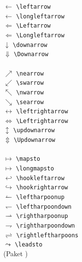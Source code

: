 \begin{minipage}{\textwidth}
\begin{multicols}{3}
\begin{tabbing}
$\leftarrow$			\>	\lstinline|\leftarrow|\\
$\longleftarrow$	\>	\lstinline|\longleftarrow| 	\\
$\Leftarrow$			\>	\lstinline|\Leftarrow| 	\\
$\Longleftarrow$	\>	\lstinline|\Longleftarrow| 	\\
$\downarrow$			\>	\lstinline|\downarrow| 	\\
$\Downarrow$			\>	\lstinline|\Downarrow| 	\\
	\tabbingrule \\
$\nearrow$				\>	\lstinline|\nearrow| 	\\
$\swarrow$				\>	\lstinline|\swarrow| 	\\
$\nwarrow$				\>	\lstinline|\nwarrow| 	\\
$\searrow$				\>	\lstinline|\searrow| 	\\
$\leftrightarrow$	\>	\lstinline|\leftrightarrow| 	\\
$\Leftrightarrow$	\>	\lstinline|\Leftrightarrow| 	\\
$\updownarrow$		\>	\lstinline|\updownarrow| 	\\
$\Updownarrow$		\>	\lstinline|\Updownarrow| 	\\
	\tabbingrule \\
$\mapsto$					\>	\lstinline|\mapsto| 	\\
$\longmapsto$			\>	\lstinline|\longmapsto| 	\\
$\hookleftarrow$	\>	\lstinline|\hookleftarrow| 	\\
$\hookrightarrow$	\>	\lstinline|\hookrightarrow| 	\\
$\leftharpoonup$	\>	\lstinline|\leftharpoonup| 	\\
$\leftharpoondown$\>	\lstinline|\leftharpoondown| 	\\
$\rightharpoonup$	\>	\lstinline|\rightharpoonup| 	\\
$\rightharpoondown$\>	\lstinline|\rightharpoondown| 	\\
$\rightleftharpoons$\> \lstinline|\rightleftharpoons| 	 \\
$\leadsto$ 				\> \lstinline|\leadsto| 	 \\  
									\> \footnotesize (Paket ) \\
\end{tabbing}
\end{multicols}
\end{minipage}
